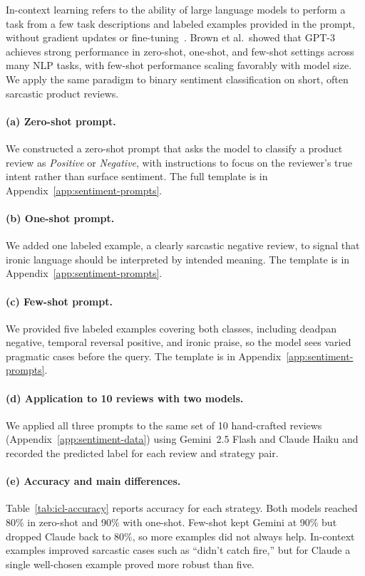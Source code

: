 In-context learning refers to the ability of large language models to perform a task from a few task descriptions and labeled examples provided in the prompt, without gradient updates or fine-tuning~\cite{brown2020language}. Brown et al.\ showed that GPT-3 achieves strong performance in zero-shot, one-shot, and few-shot settings across many NLP tasks, with few-shot performance scaling favorably with model size. We apply the same paradigm to binary sentiment classification on short, often sarcastic product reviews.

\paragraph{(a) Zero-shot prompt.}
We constructed a zero-shot prompt that asks the model to classify a product review as \emph{Positive} or \emph{Negative}, with instructions to focus on the reviewer's true intent rather than surface sentiment. The full template is in Appendix~\ref{app:sentiment-prompts}.

\paragraph{(b) One-shot prompt.}
We added one labeled example, a clearly sarcastic negative review, to signal that ironic language should be interpreted by intended meaning. The template is in Appendix~\ref{app:sentiment-prompts}.

\paragraph{(c) Few-shot prompt.}
We provided five labeled examples covering both classes, including deadpan negative, temporal reversal positive, and ironic praise, so the model sees varied pragmatic cases before the query. The template is in Appendix~\ref{app:sentiment-prompts}.

\paragraph{(d) Application to 10 reviews with two models.}
We applied all three prompts to the same set of 10 hand-crafted reviews (Appendix~\ref{app:sentiment-data}) using Gemini~2.5 Flash and Claude Haiku and recorded the predicted label for each review and strategy pair.

\paragraph{(e) Accuracy and main differences.}
Table~\ref{tab:icl-accuracy} reports accuracy for each strategy. Both models reached 80\% in zero-shot and 90\% with one-shot. Few-shot kept Gemini at 90\% but dropped Claude back to 80\%, so more examples did not always help. In-context examples improved sarcastic cases such as ``didn't catch fire,'' but for Claude a single well-chosen example proved more robust than five.


